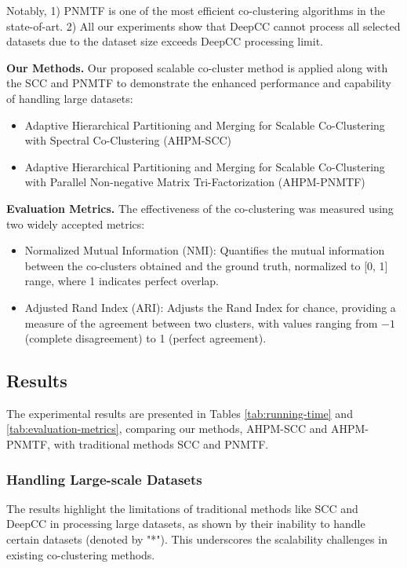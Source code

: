 Notably, 1) PNMTF is one of the most efficient co-clustering algorithms in the state-of-art. 2) All our experiments show that DeepCC cannot process all selected datasets due to the dataset size exceeds DeepCC processing limit.

\textbf{Our Methods.} Our proposed scalable co-cluster method is applied along with the SCC and PNMTF to demonstrate the enhanced performance and capability of handling large datasets:
\begin{itemize}
    \item Adaptive Hierarchical Partitioning and Merging for Scalable Co-Clustering with Spectral Co-Clustering (AHPM-SCC)
    \item Adaptive Hierarchical Partitioning and Merging for Scalable Co-Clustering with Parallel Non-negative Matrix Tri-Factorization (AHPM-PNMTF)
\end{itemize}

\textbf{Evaluation Metrics.}
The effectiveness of the co-clustering was measured using two widely accepted metrics:

\begin{itemize}
    \item Normalized Mutual Information (NMI): Quantifies the mutual information between the co-clusters obtained and the ground truth, normalized to [0, 1] range, where 1 indicates perfect overlap.
    \item Adjusted Rand Index (ARI): Adjusts the Rand Index for chance, providing a measure of the agreement between two clusters, with values ranging from $-1$ (complete disagreement) to 1 (perfect agreement).
\end{itemize}

\subsection{Results}
The experimental results are presented in Tables \ref{tab:running-time} and \ref{tab:evaluation-metrics}, comparing our methods, AHPM-SCC and AHPM-PNMTF, with traditional methods SCC and PNMTF.

\subsubsection{Handling Large-scale Datasets} The results highlight the limitations of traditional methods like SCC and DeepCC in processing large datasets, as shown by their inability to handle certain datasets (denoted by "*"). This underscores the scalability challenges in existing co-clustering methods.

